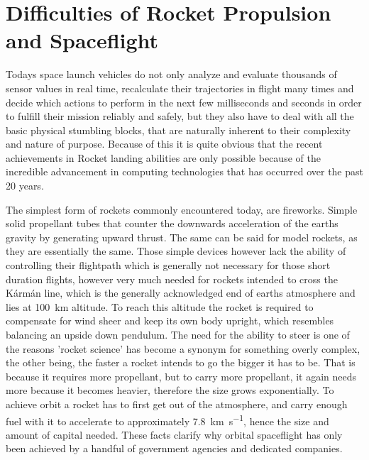 \section{Difficulties of Rocket Propulsion and Spaceflight}
\author{Sebastian Schaffler} 

Todays space launch vehicles do not only analyze and evaluate thousands of sensor values in real time, recalculate their trajectories in flight many times and decide which actions to perform in the next few milliseconds and seconds in order to fulfill their mission reliably and safely, but they also have to deal with all the basic physical stumbling blocks, that are naturally inherent to their complexity and nature of purpose. Because of this it is quite obvious that the recent achievements in Rocket landing abilities are only possible because of the incredible advancement in computing technologies that has occurred over the past 20 years. 

The simplest form of rockets commonly encountered today, are fireworks. Simple solid propellant tubes that counter the downwards acceleration of the earths gravity by generating upward thrust. The same can be said for model rockets, as they are essentially the same. Those simple devices however lack the ability of controlling their flightpath which is generally not necessary for those short duration flights, however very much needed for rockets intended to cross the Kármán line, which is the generally acknowledged end of earths atmosphere and lies at \SI{100}{\kilo\meter} altitude. To reach this altitude the rocket is required to compensate for wind sheer and keep its own body upright, which resembles balancing an upside down pendulum. The need for the ability to steer is one of the reasons 'rocket science' has become a synonym for something overly complex, the other being, the faster a rocket intends to go the bigger it has to be. That is because it requires more propellant, but to carry more propellant, it again needs more because it becomes heavier, therefore the size grows exponentially. To achieve orbit a rocket has to first get out of the atmosphere, and carry enough fuel with it to accelerate to approximately \SI{7.8}{\kilo\meter\per\second}, hence the size and amount of capital needed. These facts clarify why orbital spaceflight has only been achieved by a handful of government agencies and dedicated companies.


